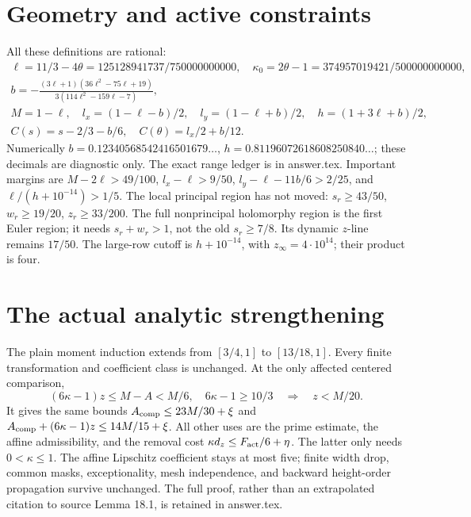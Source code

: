\documentclass[12pt]{article}
\begin{document}
\section{Geometry and active constraints}
All these definitions are rational:
\[
\begin{gathered}
 \ell=11/3-4\theta=125128941737/750000000000,\quad
 \kappa_0=2\theta-1=374957019421/500000000000,\\
 b=-\frac{(3\ell+1)(36\ell^2-75\ell+19)}
             {3(114\ell^2-159\ell-7)},\\
 M=1-\ell,\quad l_x=(1-\ell-b)/2,\quad
 l_y=(1-\ell+b)/2,\quad h=(1+3\ell+b)/2,\\
 C(s)=s-2/3-b/6,\quad C(\theta)=l_x/2+b/12 .
\end{gathered}
\]
Numerically \(b=0.12340568542416501679\ldots\),
\(h=0.81196072618608250840\ldots\);
these decimals are diagnostic only.
The exact range ledger is in answer.tex.
Important margins are \(M-2\ell>49/100\),
\(l_x-\ell>9/50\),
\(l_y-\ell-11b/6>2/25\),
and \(\ell/(h+10^{-14})>1/5\).
The local principal region has not moved: \(s_r\ge43/50\),
\(w_r\ge19/20\), \(z_r\ge33/200\).
The full nonprincipal holomorphy region is the first Euler region;
it needs \(s_r+w_r>1\), not the old \(s_r\ge7/8\).
Its dynamic \(z\)-line remains \(17/50\).
The large-row cutoff is \(h+10^{-14}\), with
\(z_\infty=4\cdot10^{14}\); their product is four.

\section{The actual analytic strengthening}
The plain moment induction extends from
\([3/4,1]\) to \([13/18,1]\).
Every finite transformation and coefficient class is unchanged.
At the only affected centered comparison,
\[
 (6\kappa-1)z\le M-A<M/6,\quad 6\kappa-1\ge10/3
       \quad\Longrightarrow\quad z<M/20.
\]
It gives the same bounds \(A_{\rm comp}\le23M/30+\xi\) and
\(A_{\rm comp}+(6\kappa-1)z\le14M/15+\xi\).
All other uses are the prime estimate, the affine admissibility,
and the removal cost \(\kappa d_z\le F_{\rm act}/6+\eta\).
The latter only needs \(0<\kappa\le1\).
The affine Lipschitz coefficient stays at most five; finite width
drop, common masks, exceptionality, mesh independence, and backward
height-order propagation survive unchanged.
The full proof, rather than an extrapolated citation to source
Lemma 18.1, is retained in answer.tex.
\end{document}
